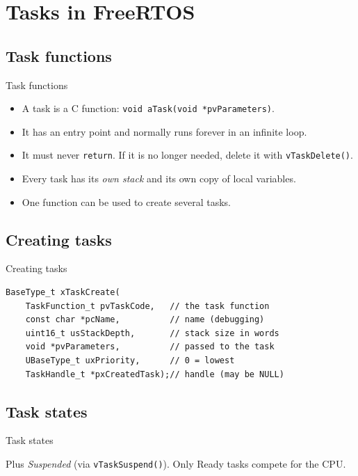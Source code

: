\section{Tasks in FreeRTOS}

\subsection{Task functions}
\begin{frame}{Task functions}
  \begin{itemize}
    \item A task is a C function: \texttt{void aTask(void *pvParameters)}.
    \item It has an entry point and normally runs forever in an infinite loop.
    \item It must never \texttt{return}. If it is no longer needed, delete it with \texttt{vTaskDelete()}.
    \item Every task has its \emph{own stack} and its own copy of local variables.
    \item One function can be used to create several tasks.
  \end{itemize}
\end{frame}

\subsection{Creating tasks}
\begin{frame}[fragile]{Creating tasks}
\begin{lstlisting}
BaseType_t xTaskCreate(
    TaskFunction_t pvTaskCode,   // the task function
    const char *pcName,          // name (debugging)
    uint16_t usStackDepth,       // stack size in words
    void *pvParameters,          // passed to the task
    UBaseType_t uxPriority,      // 0 = lowest
    TaskHandle_t *pxCreatedTask);// handle (may be NULL)
\end{lstlisting}
\end{frame}

\subsection{Task states}
\begin{frame}{Task states}
  \begin{center}
  \end{center}
  Plus \emph{Suspended} (via \texttt{vTaskSuspend()}). Only Ready tasks compete for the CPU.
\end{frame}


